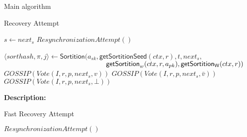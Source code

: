 \documentclass[10pt,a4paper]{article}
\begin{document}
\begin{section}{Main algorithm}
\begin{subsection}{Recovery Attempt}\label{ssect:Recovery}

    \begin{algorithm}[H]
        \begin{algorithmic}[1]

        \State $s \gets next_s$
        \State $ResynchronizationAttempt()$
    
            \State $\langle sorthash, \pi, j\rangle\gets 
            \mathsf{Sortition}(
            a_{sk}, 
            \mathsf{getSortitionSeed}(ctx, r), 
            t, 
            next_s, $ \newline
            ${}$ ${\hskip 5.2cm}\mathsf{getSortition}_w(ctx, r, a_{pk}), 
            \mathsf{getSortition_W}(ctx, r)
            )$
                    \State $GOSSIP(Vote(I, r, p, next_s, v))$
                    \State $GOSSIP(Vote(I, r, p, next_s, \bar{v}))$
                \Else
                    \State $GOSSIP(Vote(I, r, p, next_s, \bot))$
                \EndIf
            \EndIf    
        \EndFor


        \EndFunction
        \end{algorithmic}
        \caption{\underline{Recovery}}
    \end{algorithm}
    
    
    \noindent \textbf{Description:}\\
    
\end{subsection}


\begin{subsection}{Fast Recovery Attempt}\label{ssect:FastRecovery}

    \begin{algorithm}[H]
        \begin{algorithmic}[1]

        \State $ResynchronizationAttempt()$
    

\end{algorithmic}
\end{algorithm}
\end{subsection}
\end{section}
\end{document}
